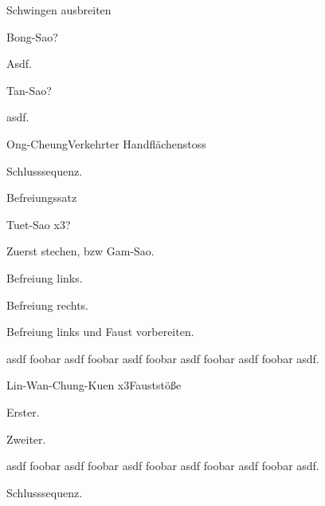 \begin{WTSatz}{Schwingen ausbreiten}%
	\begin{WTSatzTeil}{Bong-Sao}{?}
		
		Asdf.
	\end{WTSatzTeil}
	\begin{WTSatzTeil}{Tan-Sao}{?}
		
		asdf.
	\end{WTSatzTeil}
	\begin{WTSatzTeil}{Ong-Cheung}{Verkehrter Handfl\"achenstoss}
		
		Schlusssequenz.
	\end{WTSatzTeil}
\end{WTSatz}


\begin{WTSatz}{Befreiungssatz}%
	\begin{WTSatzTeil}{Tuet-Sao x3}{?}
	
		Zuerst stechen, bzw Gam-Sao.
		
		
		Befreiung links.
		
		
		Befreiung rechts.
		
		
		Befreiung links und Faust vorbereiten.
		

		asdf foobar asdf foobar asdf foobar asdf foobar asdf foobar asdf.
	\end{WTSatzTeil}
	\begin{WTSatzTeil}{Lin-Wan-Chung-Kuen x3}{Faustst\"o{\ss}e}
		
		Erster.
	
		
		Zweiter.
		
		
		asdf foobar asdf foobar asdf foobar asdf foobar asdf foobar asdf.
		
		Schlusssequenz.
	\end{WTSatzTeil}
\end{WTSatz}







